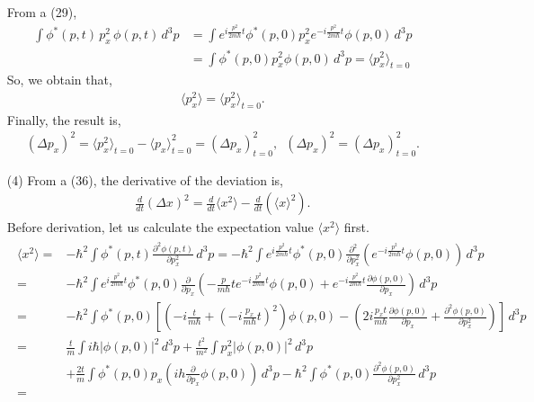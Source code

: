 \documentclass[floatfix,nofootinbib,superscriptaddress,fleqn]{revtex4}
\begin{document}
\begin{itemize}
  From a (29),
  \begin{align}      
    \int \phi^*(p,t)\,p^2_x\,\phi(p,t)\,d^3p
    &= \int e^{i\frac{p^2}{2m\hbar}t}\phi^*(p,0)p^2_x e^{-i\frac{p^2}{2m\hbar}t}\phi(p,0)\,d^3p  \\
    &= \int \phi^*(p,0)p^2_x\phi(p,0)\,d^3p = \langle p^2_x \rangle_{t=0}
  \end{align}
  So, we obtain that,
  \begin{align}
    \langle p_x^2 \rangle=\langle p_x^2 \rangle_{t=0}.
  \end{align}
Finally, the result is,
\begin{align}
  (\Delta p_x)^2 = \langle p_x^2\rangle_{t=0}-\langle p_x \rangle^2_{t=0}=(\Delta p_x)^2_{t=0}, 
  \,\,\, (\Delta p_x)^2=(\Delta p_x)^2_{t=0}. 
\end{align}
  \item[(4)] From a (36), the derivative of the deviation is,
  \begin{align}
    \frac{d}{dt}(\Delta x)^2 = \frac{d}{dt}\langle x^2 \rangle-\frac{d}{dt}\left(\langle x \rangle^2\right). 
  \end{align}
  Before derivation, let us calculate the expectation value $\langle x^2 \rangle$ first.
  \begin{align}
    \begin{split}  
      \langle x^2 \rangle =& -\hbar^2\int \phi^*(p,t)\frac{\partial^2 \phi(p,t)}{\partial p_x^2}\,d^3p
      = -\hbar^2\int e^{i\frac{p^2}{2m\hbar}t}\phi^*(p,0)\frac{\partial^2 }{\partial p_x^2}\left(e^{-i\frac{p^2}{2m\hbar}t}\phi(p,0)\right)\,d^3p  \\
      =& -\hbar^2\int e^{i\frac{p^2}{2m\hbar}t}\phi^*(p,0)\frac{\partial}{\partial p_x}\left(-\frac{p}{m\hbar}te^{-i\frac{p^2}{2m\hbar}t}\phi(p,0)
      +e^{-i\frac{p^2}{2m\hbar}t}\frac{\partial \phi(p,0)}{\partial p_x}\right)\,d^3p  \\
      =& -\hbar^2\int \phi^*(p,0)\left[\left(-i\frac{t}{m\hbar}+\left( -i\frac{p_x}{m\hbar}t \right)^2\right)\phi(p,0)
      -\left(2i\frac{p_xt}{m\hbar}\frac{\partial \phi(p,0)}{\partial p_x}+\frac{\partial^2 \phi(p,0)}{\partial p_x^2}\right) \right]\,d^3p  \\
      =& \frac{t}{m}\int i\hbar|\phi(p,0)|^2\,d^3p+\frac{t^2}{m^2}\int p_x^2|\phi(p,0)|^2\,d^3p  \\
      &+\frac{2t}{m}\int \phi^*(p,0) p_x \left(ih\frac{\partial}{\partial p_x}\phi(p,0)\right)\,d^3p-\hbar^2\int\phi^*(p,0)\frac{\partial^2 \phi(p,0)}{\partial p_x^2}\,d^3p  \\
      =& 
    \end{split}
  \end{align}
\end{itemize} 
\newpage
\end{document}
